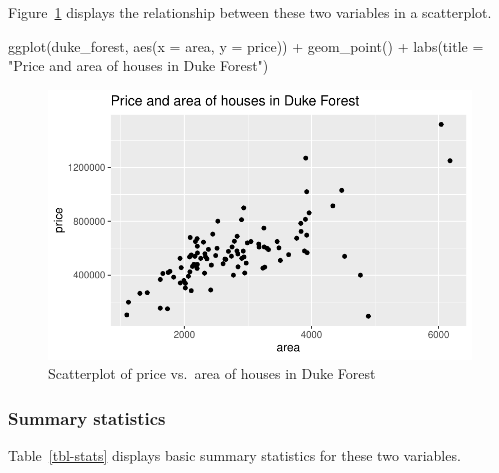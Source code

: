 \documentclass[
  letterpaper,
  DIV=11,
  numbers=noendperiod]{scrartcl}
\newenvironment{Shaded}{\begin{snugshade}}{\end{snugshade}}
\newcommand{\AttributeTok}[1]{\textcolor[rgb]{0.40,0.45,0.13}{#1}}
\newcommand{\FunctionTok}[1]{\textcolor[rgb]{0.28,0.35,0.67}{#1}}
\newcommand{\NormalTok}[1]{\textcolor[rgb]{0.00,0.23,0.31}{#1}}
\newcommand{\SpecialCharTok}[1]{\textcolor[rgb]{0.37,0.37,0.37}{#1}}
\newcommand{\StringTok}[1]{\textcolor[rgb]{0.13,0.47,0.30}{#1}}
\begin{document}
Figure~\ref{fig-scatterplot} displays the relationship between these two
variables in a scatterplot.

\begin{Shaded}
\begin{Highlighting}[]
\FunctionTok{ggplot}\NormalTok{(duke\_forest, }\FunctionTok{aes}\NormalTok{(}\AttributeTok{x =}\NormalTok{ area, }\AttributeTok{y =}\NormalTok{ price)) }\SpecialCharTok{+}
  \FunctionTok{geom\_point}\NormalTok{() }\SpecialCharTok{+}
  \FunctionTok{labs}\NormalTok{(}\AttributeTok{title =} \StringTok{"Price and area of houses in Duke Forest"}\NormalTok{)}
\end{Highlighting}
\end{Shaded}

\begin{figure}[H]

{\centering \includegraphics{teste_03_files/figure-pdf/fig-scatterplot-1.pdf}

}

\caption{\label{fig-scatterplot}Scatterplot of price vs.~area of houses
in Duke Forest}

\end{figure}

\hypertarget{summary-statistics}{%
\subsubsection{Summary statistics}\label{summary-statistics}}

Table~\ref{tbl-stats} displays basic summary statistics for these two
variables.
\end{document}
